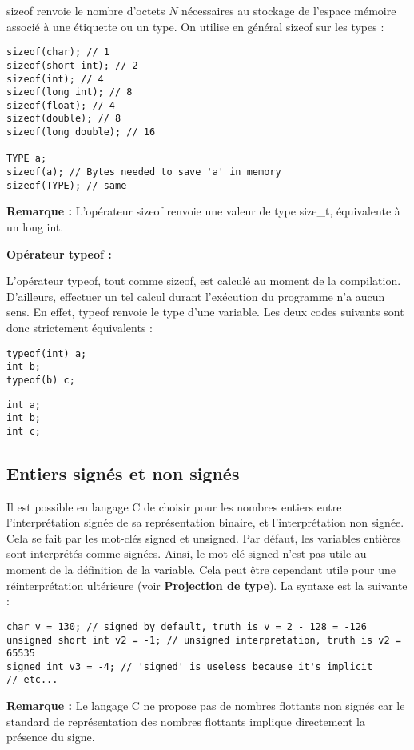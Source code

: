 \documentclass[../../../main.tex]{subfiles}
\begin{document}
\textsf{sizeof} renvoie le nombre d'octets $N$ nécessaires au stockage de l'espace mémoire associé à une étiquette ou un type. On utilise en général \textsf{sizeof} sur les types :
\begin{verbatim}
sizeof(char); // 1
sizeof(short int); // 2
sizeof(int); // 4
sizeof(long int); // 8
sizeof(float); // 4
sizeof(double); // 8
sizeof(long double); // 16

TYPE a;
sizeof(a); // Bytes needed to save 'a' in memory
sizeof(TYPE); // same
\end{verbatim}
\textbf{Remarque :} L'opérateur \textsf{sizeof} renvoie une valeur de type \textsf{size\_t}, équivalente à un \textsf{long int}.
 
\textbf{Opérateur \textsf{typeof} :}
 
L'opérateur \textsf{typeof}, tout comme \textsf{sizeof}, est calculé au moment de la compilation. D'ailleurs, effectuer un tel calcul durant l'exécution du programme n'a aucun sens. En effet, \textsf{typeof} renvoie le type d'une variable. Les deux codes suivants sont donc strictement équivalents : 

\begin{minipage}{0.5\textwidth}
\begin{verbatim}
typeof(int) a;
int b;
typeof(b) c;
\end{verbatim}
\end{minipage}
\begin{minipage}{0.5\textwidth}
\begin{verbatim}
int a;
int b;
int c;
\end{verbatim}
\end{minipage}
\subsection{Entiers signés et non signés}
Il est possible en langage C de choisir pour les nombres entiers entre l'interprétation signée de sa représentation binaire, et l'interprétation non signée. Cela se fait par les mot-clés \textsf{signed} et \textsf{unsigned}. Par défaut, les variables entières sont interprétés comme signées. Ainsi, le mot-clé \textsf{signed} n'est pas utile au moment de la définition de la variable. Cela peut être cependant utile pour une réinterprétation ultérieure (voir \textbf{Projection de type}). La syntaxe est la suivante :
\begin{verbatim}
char v = 130; // signed by default, truth is v = 2 - 128 = -126
unsigned short int v2 = -1; // unsigned interpretation, truth is v2 = 65535
signed int v3 = -4; // 'signed' is useless because it's implicit
// etc...
\end{verbatim}
\textbf{Remarque :} Le langage C ne propose pas de nombres flottants non signés car le standard de représentation des nombres flottants implique directement la présence du signe.
\end{document}
